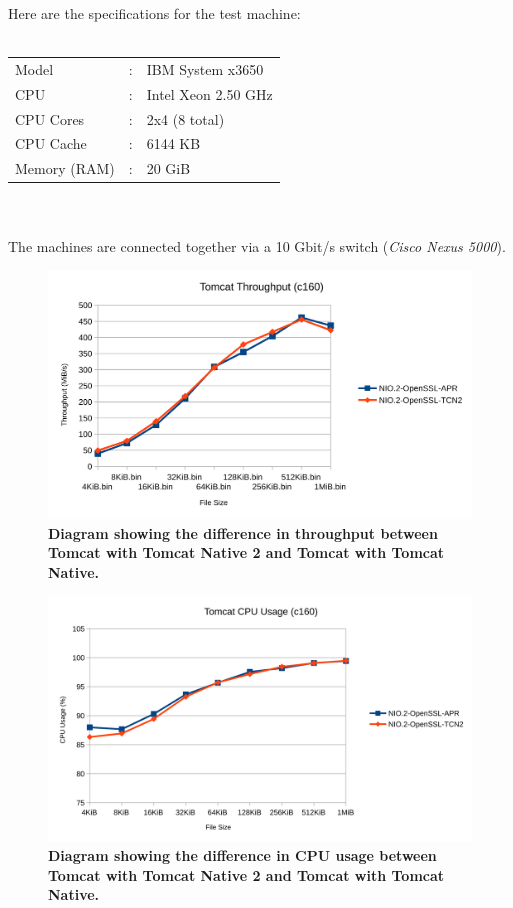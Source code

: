 \documentclass[11pt,a4paper,bibliography=totocnumbered]{scrartcl}
\def\mytitle{Tomcat Native 2}
\begin{document}
Here are the specifications for the test machine:
\\
\\
\begin{tabular}{lrl}
	Model&: & IBM System x3650 \\ 
	CPU&: & Intel Xeon 2.50 GHz \\
	CPU Cores&: & 2x4 (8 total) \\
	CPU Cache&: & 6144 KB \\
	Memory (RAM)&: & 20 GiB \\ 
\end{tabular} 
\\
\\
The machines are connected together via a 10 Gbit/s switch (\textit{Cisco Nexus 5000}).
\begin{figure}[!h]
	\begin{center}
		\includegraphics[scale=0.23]{tomcat-throughput.pdf}
	\end{center}
	\caption{\textbf{Diagram showing the difference in throughput between Tomcat with \mytitle{} and Tomcat with Tomcat Native.}}
	\label{fig:tomcat-throughput}
\end{figure}

\begin{figure}[!h]
	\begin{center}
		\includegraphics[scale=0.22]{tomcat-cpu.pdf}
	\end{center}
	\caption{\textbf{Diagram showing the difference in CPU usage between Tomcat with \mytitle{} and Tomcat with Tomcat Native.}}
	\label{fig:tomcat-cpu}
\end{figure}
\end{document}
